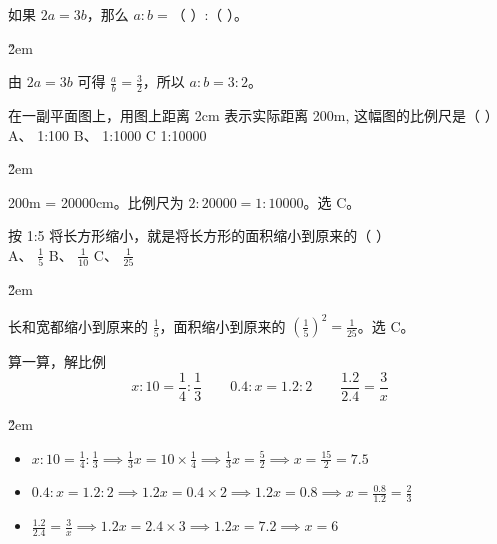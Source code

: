 \begin{example}
    如果 $2a=3b$，那么 $a:b=$（ \quad ）:（ \quad ）。
\end{example}

\v{2em}

\begin{solution}
    由 $2a=3b$ 可得 $\frac{a}{b} = \frac{3}{2}$，所以 $a:b = 3:2$。
\end{solution}

\begin{example}
    在一副平面图上，用图上距离 2cm 表示实际距离 200m, 这幅图的比例尺是（ \quad ）\\
    A、 1:100 \qquad B、 1:1000 \qquad C 1:10000
\end{example}

\v{2em}

\begin{solution}
    200m = 20000cm。比例尺为 $2:20000 = 1:10000$。选 C。
\end{solution}

\begin{example}
    按 1:5 将长方形缩小，就是将长方形的面积缩小到原来的（ \quad ）\\
    A、 $\frac{1}{5}$ \qquad B、 $\frac{1}{10}$ \qquad C、 $\frac{1}{25}$
\end{example}

\v{2em}

\begin{solution}
    长和宽都缩小到原来的 $\frac{1}{5}$，面积缩小到原来的 $(\frac{1}{5})^2 = \frac{1}{25}$。选 C。
\end{solution}

\begin{example}
    算一算，解比例
    $$ x:10 = \frac{1}{4}:\frac{1}{3} \qquad 0.4:x = 1.2:2 \qquad \frac{1.2}{2.4} = \frac{3}{x} $$
\end{example}

\v{2em}

\begin{solution}
    \begin{itemize}
        \item $x:10 = \frac{1}{4}:\frac{1}{3} \implies \frac{1}{3}x = 10 \times \frac{1}{4} \implies \frac{1}{3}x = \frac{5}{2} \implies x = \frac{15}{2} = 7.5$
        \item $0.4:x = 1.2:2 \implies 1.2x = 0.4 \times 2 \implies 1.2x = 0.8 \implies x = \frac{0.8}{1.2} = \frac{2}{3}$
        \item $\frac{1.2}{2.4} = \frac{3}{x} \implies 1.2x = 2.4 \times 3 \implies 1.2x = 7.2 \implies x = 6$
    \end{itemize}
\end{solution}


